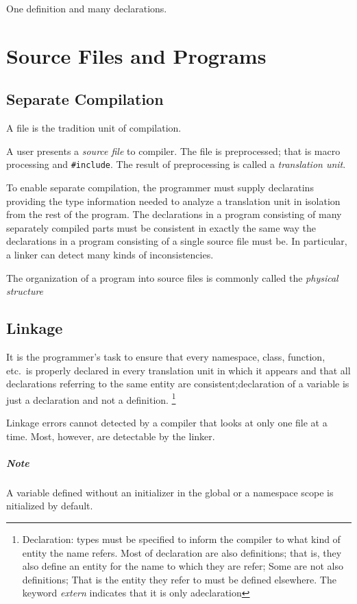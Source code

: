 \documentclass[a4paper,12pt]{book}
\begin{document}
One definition and many declarations.

\chapter{Source Files and Programs}
\section{Separate Compilation}
A file is the tradition unit of compilation.

A user presents a \emph{source file} to compiler. The file is preprocessed; that is macro processing and \verb|#include|. The result of preprocessing is called a \emph{translation unit}.

To enable separate compilation, the programmer must supply declaratins providing the type information needed to analyze a translation unit in isolation from the rest of the program. The declarations in a program consisting of many separately compiled parts must be consistent in exactly the same way the declarations in a program consisting of a single source file must be. In particular, a linker can detect many kinds of inconsistencies.

The organization of a program into source files is commonly called the \emph{physical structure}

\section{Linkage}It is the programmer's task to ensure that every namespace, class, function, etc.\ is properly declared in every translation unit in which it appears and that all declarations referring to the same entity are consistent;declaration of a variable is just a declaration and not a definition. \footnote{Declaration: types must be specified to inform the compiler to what kind of entity the name refers. Most of declaration are also definitions; that is, they also define an entity for the name to which they are refer; Some are not also definitions; That is the entity they refer to must be defined elsewhere.  The keyword \emph{extern} indicates that it is only adeclaration}

Linkage errors cannot detected by a compiler that looks at only one file at a time. Most, however, are detectable by the linker. 
\paragraph{Note} A variable defined without an initializer in the global or a namespace scope is nitialized by default. 
\end{document}

